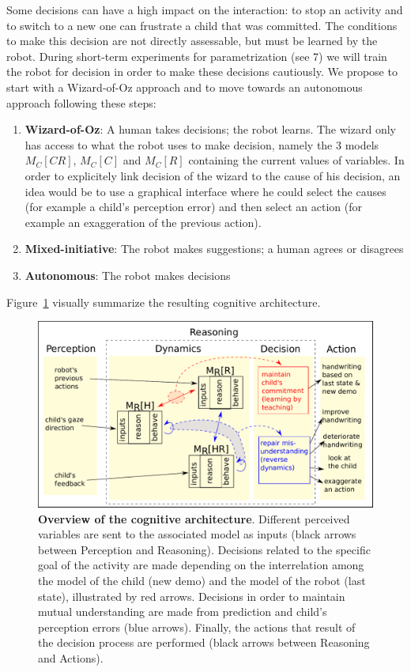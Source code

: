 \documentclass[10pt,a4paper]{article}
\begin{document}
Some decisions can have a high impact on the interaction: to stop an activity and to switch to a new one can frustrate a child that was committed. 
The conditions to make this decision are not directly assessable, but must be learned by the robot. 
During short-term experiments for parametrization (see 7) we will train the robot for decision in order to make these decisions cautiously. We propose to start with a Wizard-of-Oz approach and to move towards an autonomous approach following these steps: 
\begin{enumerate}
\item \textbf{Wizard-of-Oz}: A human takes decisions; the robot learns. The wizard only has access to what the robot uses to make decision, namely the 3 models $M_C\left[CR\right]$, $M_C\left[C\right]$ and $M_C\left[R\right]$ containing the current values of variables. In order to explicitely link decision of the wizard to the cause of his decision, an idea would be to use a graphical interface where he could select the causes (for example a child's perception error) and then select an action (for example an exaggeration of the previous action).
\item \textbf{Mixed-initiative}: The robot makes suggestions; a human agrees or disagrees
\item \textbf{Autonomous}: The robot makes decisions
\end{enumerate}

Figure~\ref{final} visually summarize the resulting cognitive architecture.  
\begin{figure}[!]
\centering
\includegraphics[width=1\columnwidth]{final_archi}
\caption{\small \textbf{Overview of the cognitive architecture}. Different perceived variables are sent to the associated model as inputs (black arrows between Perception and Reasoning). Decisions related to the specific goal of the activity are made depending on the interrelation among the model of the child (new demo) and the model of the robot (last state), illustrated by red arrows. Decisions in order to maintain mutual understanding are made from prediction and child's perception errors (blue arrows). Finally, the actions that result of the decision process are performed (black arrows between Reasoning and Actions).}
\label{final}
\end{figure} 
\end{document}
